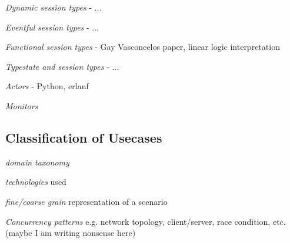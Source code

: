 {\em Dynamic session types} - ...

{\em Eventful session types} - ...

{\em Functional session types} - Gay Vasconcelos paper, linear logic interpretation

{\em Typestate and session types} - ...

{\em Actors} - Python, erlanf

{\em Monitors}

\subsection{Classification of Usecases}

{\em domain taxonomy}

{\em technologies} used

{\em  fine/coarse grain} representation of a scenario

{\em Concurrency patterns} e.g. network topology, client/server, race condition, etc. (maybe I am writing nonsense here)

